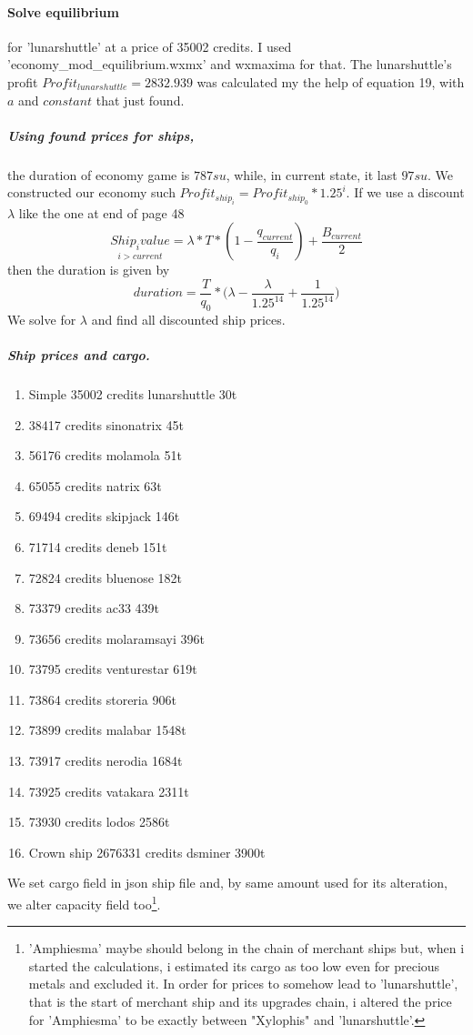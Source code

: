 \documentclass[]{article}
\begin{document}
\paragraph{Solve equilibrium} for 'lunarshuttle' at a price of 35002 credits. I used 'economy\_mod\_equilibrium.wxmx' and wxmaxima for that. The lunarshuttle's profit $Profit_{lunarshuttle}=2832.939$ was calculated my the help of equation 19, with $a$ and $constant$ that just found.
\subparagraph*{Using found prices for ships,} the duration of economy game is $787su$, while, in current state, it last $97su$. We constructed our economy such $Profit_{ship_{i}}=Profit_{ship_{0}}*1.25^{i}$. If we use a discount $\lambda$ like the one at end of page 48 
\[\underset{i > current}{Ship_{i}value}=\lambda*T*(1-\dfrac{q_{current}}{q_{i}})+\dfrac{B_{current}}{2}\]then the duration is given by \[duration=\dfrac{T}{q_{0}}*\big(\lambda-\dfrac{\lambda}{1.25^{14}}+\dfrac{1}{1.25^{14}}\big)\]   We solve for $\lambda$ and  find all discounted ship prices.
\subparagraph{Ship prices and cargo.}
\begin{enumerate}[label=\Roman*,start=0]
\item 	Simple 35002 credits lunarshuttle	30t
	\item 38417 credits	sinonatrix	45t
		\item 56176 credits	molamola	51t		
		\item 65055 credits	natrix	63t
	\item  69494 credits	skipjack	146t
	\item 71714 credits	deneb	151t			
	\item 72824 credits	bluenose	182t		
	\item  73379 credits	ac33	439t
\item 73656 credits	molaramsayi	396t	
	\item  73795 credits	venturestar	619t
	\item 73864 credits	storeria	906t	
	\item 73899 credits	malabar	1548t
	\item  73917 credits	nerodia	1684t
	\item  73925 credits	vatakara	2311t				
	\item 73930 credits	lodos	2586t			
	\item Crown ship 2676331 credits dsminer	3900t
\end{enumerate}

We set cargo field in json ship file and, by same amount used for its alteration, we alter capacity field too\footnote{\nopagebreak'Amphiesma' maybe should belong in the chain of merchant ships but, when i started the calculations, i estimated its cargo as too low even for precious metals and excluded it. In order for prices to somehow lead to 'lunarshuttle', that is the start of merchant ship and its upgrades chain, i altered the price for 'Amphiesma' to be exactly between "Xylophis" and 'lunarshuttle'.  }. 
\end{document}
